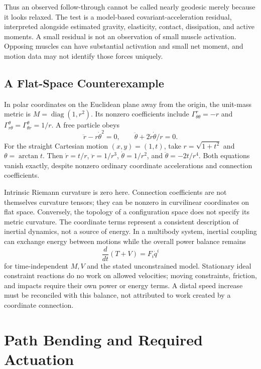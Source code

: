 \documentclass[12pt, openany]{book}
\theoremstyle{plain}
\begin{document}
Thus an observed follow-through cannot be called nearly geodesic merely
because it looks relaxed. The test is a model-based covariant-acceleration
residual, interpreted alongside estimated gravity, elasticity, contact,
dissipation, and active moments. A small residual is not an observation of
small muscle activation. Opposing muscles can have substantial activation
and small net moment, and motion data may not identify those forces uniquely.

\subsection{A Flat-Space Counterexample}

In polar coordinates on the Euclidean plane away from the origin, the unit-mass
metric is $M=\operatorname{diag}(1,r^2)$. Its nonzero coefficients include
$\Gamma^r_{\theta\theta}=-r$ and
$\Gamma^\theta_{r\theta}=\Gamma^\theta_{\theta r}=1/r$. A free particle obeys
\begin{equation}\label{eq:manifold_polar_geodesic}
 \ddot r-r\dot\theta^2=0,\qquad
 \ddot\theta+2\dot r\dot\theta/r=0.
\end{equation}
For the straight Cartesian motion $(x,y)=(1,t)$, take
$r=\sqrt{1+t^2}$ and $\theta=\arctan t$. Then
$\dot r=t/r$, $\ddot r=1/r^3$, $\dot\theta=1/r^2$, and
$\ddot\theta=-2t/r^4$. Both equations vanish exactly, despite nonzero
ordinary coordinate accelerations and connection coefficients.

Intrinsic Riemann curvature is zero here. Connection coefficients are not
themselves curvature tensors; they can be nonzero in curvilinear coordinates
on flat space. Conversely, the topology of a configuration space does not
specify its metric curvature. The coordinate terms represent a consistent
description of inertial dynamics, not a source of energy. In a multibody
system, inertial coupling can exchange energy between motions while the
overall power balance remains
\begin{equation}\label{eq:manifold_energy_balance}
 \frac{d}{dt}(T+V)=F_i\dot q^i
\end{equation}
for time-independent $M,V$ and the stated unconstrained model. Stationary
ideal constraint reactions do no work on allowed velocities; moving constraints,
friction, and impacts require their own power or energy terms. A distal speed
increase must be reconciled with this balance, not attributed to work created
by a coordinate connection.

\section{Path Bending and Required Actuation}
\end{document}
